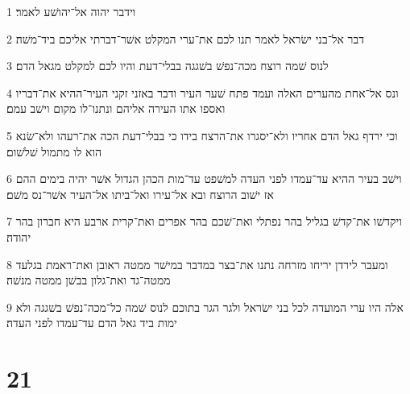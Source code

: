 \par 1 וידבר יהוה אל־יהושׁע לאמר׃
\par 2 דבר אל־בני ישׂראל לאמר תנו לכם את־ערי המקלט אשׁר־דברתי אליכם ביד־משׁה׃
\par 3 לנוס שׁמה רוצח מכה־נפשׁ בשׁגגה בבלי־דעת והיו לכם למקלט מגאל הדם׃
\par 4 ונס אל־אחת מהערים האלה ועמד פתח שׁער העיר ודבר באזני זקני העיר־ההיא את־דבריו ואספו אתו העירה אליהם ונתנו־לו מקום וישׁב עמם׃
\par 5 וכי ירדף גאל הדם אחריו ולא־יסגרו את־הרצח בידו כי בבלי־דעת הכה את־רעהו ולא־שׂנא הוא לו מתמול שׁלשׁום׃
\par 6 וישׁב בעיר ההיא עד־עמדו לפני העדה למשׁפט עד־מות הכהן הגדול אשׁר יהיה בימים ההם אז ישׁוב הרוצח ובא אל־עירו ואל־ביתו אל־העיר אשׁר־נס משׁם׃
\par 7 ויקדשׁו את־קדשׁ בגליל בהר נפתלי ואת־שׁכם בהר אפרים ואת־קרית ארבע היא חברון בהר יהודה׃
\par 8 ומעבר לירדן יריחו מזרחה נתנו את־בצר במדבר במישׁר ממטה ראובן ואת־ראמת בגלעד ממטה־גד ואת־גלון בבשׁן ממטה מנשׁה׃
\par 9 אלה היו ערי המועדה לכל בני ישׂראל ולגר הגר בתוכם לנוס שׁמה כל־מכה־נפשׁ בשׁגגה ולא ימות ביד גאל הדם עד־עמדו לפני העדה׃

\chapter{21}

